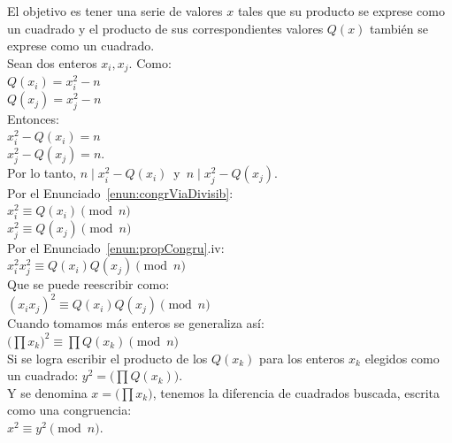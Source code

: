 El objetivo es tener una serie de valores $x$ tales que su producto se exprese como un cuadrado y el producto de sus correspondientes valores $Q(x)$ también se exprese como un cuadrado. \\

Sean dos enteros $x_i, x_j$. Como: \\
$Q(x_i) = x_i^2 - n$ \\
$Q(x_j) = x_j^2 - n$ \\
Entonces: \\
$x_i^2 - Q(x_i) = n$ \\
$x_j^2 - Q(x_j) = n$. \\
Por lo tanto, $n \mid x_i^2 - Q(x_i)\,$ y  $\, n \mid x_j^2 - Q(x_j)$.  \\
Por el  Enunciado~\ref{enun:congrViaDivisib}: \\
$x_i^2 \equiv Q(x_i) \pmod n$ \\
$x_j^2 \equiv Q(x_j) \pmod n$ \\
Por el Enunciado~\ref{enun:propCongru}.iv: \\
$x_i^2 x_j^2 \equiv Q(x_i)Q(x_j) \pmod n$ \\
Que se puede reescribir como: \\
$(x_i x_j)^2 \equiv Q(x_i)Q(x_j) \pmod n$ \\

Cuando tomamos más enteros se generaliza así: \\ 
$\Big(\prod x_k\Big)^2 \equiv \prod Q(x_k) \pmod n $ \\

Si se logra escribir el producto de los $Q(x_k)$ para los enteros $x_k$ elegidos como un cuadrado: $y^2=\Big(\prod Q(x_k)\Big)$. \\
Y se denomina $x=\Big( \prod x_k\Big)$, tenemos la diferencia de cuadrados buscada, escrita como una congruencia: \\
$x^2 \equiv y^2 \pmod n$.

